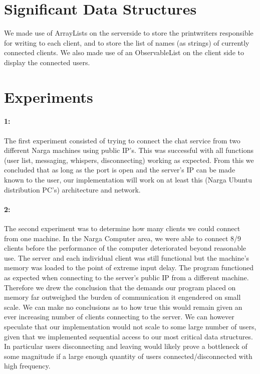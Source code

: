 \documentclass[12pt, a4paper]{article}
\begin{document}
\section{Significant Data Structures}
We made use of ArrayLists on the serverside to store the printwriters responsible for writing to each client, and to store the list of names (as strings) of currently connected clients. We also made use of an ObservableList on the client side to display the connected users.

\section{Experiments}
\paragraph{1:}
 The first experiment consisted of trying to connect the chat service from two different Narga machines using public IP's. This was successful with all functions (user list, messaging, whispers, disconnecting) working as expected. From this we concluded that as long as the port is open and the server's IP can be made known to the user, our implementation will work on at least this (Narga Ubuntu distribution PC's) architecture and network.
\paragraph{2:}
The second experiment was to determine how many clients we could connect from one machine. In the Narga Computer area, we were able to connect 8/9 clients before the performance of the computer deteriorated beyond reasonable use. The server and each individual client was still functional but the machine's memory was loaded to the point of extreme input delay.
The program functioned as expected when connecting to the server's public IP from a different machine.
Therefore we drew the conclusion that the demands our program placed on memory far outweighed the burden of communication it engendered on small scale. We can make no conclusions as to how true this would remain given an ever increasing number of clients connecting to the server. We can however speculate that our implementation would not scale to some large number of users, given that we implemented sequential access to our most critical data structures. In particular users disconnecting and leaving would likely prove a bottleneck of some magnitude if a large enough quantity of users connected/disconnected with high frequency.
\end{document}

